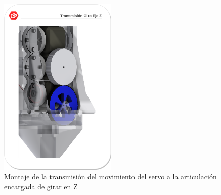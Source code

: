 	\begin{figure}[H]
		\centering
		\includegraphics[width=0.5\textwidth]{figuras/Imagenes_Mecanica/RuedasGiroZ.png}
		\caption{Montaje de la transmisión del movimiento del servo a la articulación encargada de girar en Z }
		\label{fig:Mecanica:giro_z}
	\end{figure}

